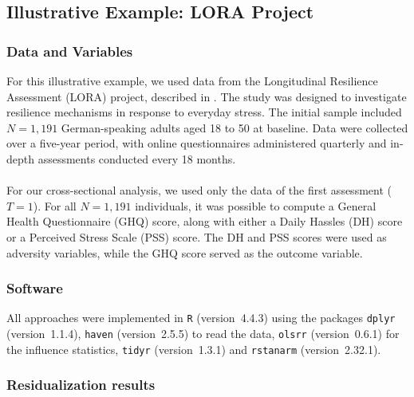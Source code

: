 \documentclass[12pt]{article}
\begin{document}
\subsection{Illustrative Example: LORA Project}
\subsubsection{Data and Variables}
For this illustrative example, we used data from the Longitudinal Resilience Assessment (LORA) project, described in \cite{LORA}. The study was designed to investigate resilience mechanisms in response to everyday stress. The initial sample included \( N = 1{,}191 \) German-speaking adults aged 18 to 50 at baseline. Data were collected over a five-year period, with online questionnaires administered quarterly and in-depth assessments conducted every 18 months.\\
\\
For our cross-sectional analysis, we used only the data of the first assessment (\( T = 1 \)). For all \( N = 1{,}191 \) individuals, it was possible to compute a General Health Questionnaire (GHQ) score, along with either a Daily Hassles (DH) score or a Perceived Stress Scale (PSS) score. The DH and PSS scores were used as adversity variables, while the GHQ score served as the outcome variable.

\subsubsection{Software}
All approaches were implemented in \texttt{R} (version~4.4.3) using the packages \texttt{dplyr} (version~1.1.4), \texttt{haven} (version~2.5.5) to read the data, \texttt{olsrr} (version~0.6.1) for the influence statistics, \texttt{tidyr} (version~1.3.1) and \texttt{rstanarm} (version~2.32.1).

\subsubsection{Residualization results}
\end{document}
